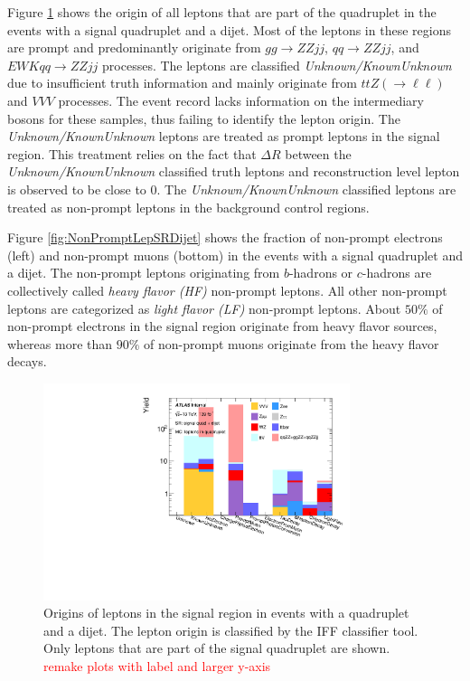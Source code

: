 Figure \ref{fig:LeptonCompositionSRVBS} shows the origin of all leptons that are part of the quadruplet in the events with a signal quadruplet and a dijet. Most of the leptons in these regions are prompt and predominantly originate from $gg \rightarrow ZZjj$, $qq \rightarrow ZZjj$, and $ EWK qq \rightarrow ZZjj$ processes. The leptons are classified \textit{Unknown/KnownUnknown} due to insufficient truth information and mainly originate from $ttZ(\rightarrow \ell \ell)$ and $VVV$ processes. The event record lacks information on the intermediary bosons for these samples, thus failing to identify the lepton origin. The \textit{Unknown/KnownUnknown} leptons are treated as prompt leptons in the signal region. This treatment relies on the fact that $\Delta R$ between the \textit{Unknown/KnownUnknown} classified truth leptons and reconstruction level lepton is observed to be close to $0$. The \textit{Unknown/KnownUnknown} classified leptons are treated as non-prompt leptons in the background control regions. 

Figure \ref{fig:NonPromptLepSRDijet} shows the fraction of non-prompt electrons (left) and non-prompt muons (bottom) in the events with a signal quadruplet and a dijet. The non-prompt leptons originating from $b$-hadrons or $c$-hadrons are collectively called \textit{heavy flavor (HF)} non-prompt leptons. All other non-prompt leptons are categorized as \textit{light flavor (LF)} non-prompt leptons. About $50\%$ of non-prompt electrons in the signal region originate from heavy flavor sources, whereas more than $90\%$ of non-prompt muons originate from the heavy flavor decays.

\begin{figure}[htb]
    \centering
    \includegraphics[width = 0.8\textwidth]{figures/Analysis/Background/AllLeptonSRDijetComposition.pdf}
    \caption{ Origins of leptons in the signal region in events with a quadruplet and a dijet. The lepton origin is classified by the IFF classifier tool. Only leptons that are part of the signal quadruplet are shown. \textcolor{red}{remake plots with label and larger y-axis} \label{fig:LeptonCompositionSRVBS}}
\end{figure}

